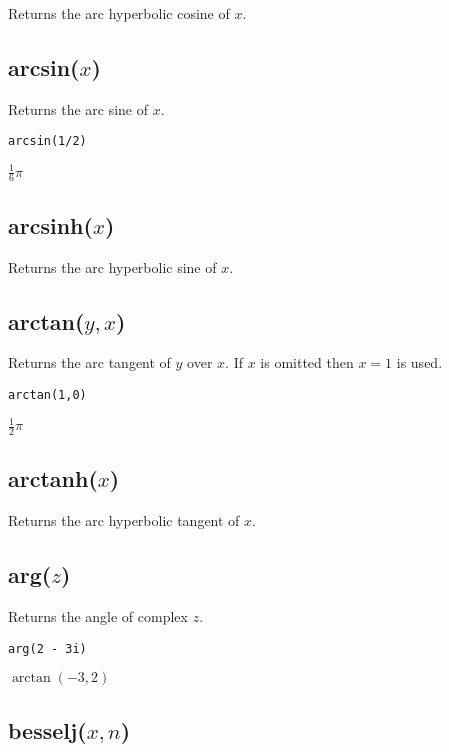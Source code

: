 Returns the arc hyperbolic cosine of $x$.

\subsection*{arcsin($x$)}

Returns the arc sine of $x$.

{\color{blue}
\begin{verbatim}
arcsin(1/2)
\end{verbatim}
}

\noindent
$\tfrac{1}{6}\pi$

\subsection*{arcsinh($x$)}

Returns the arc hyperbolic sine of $x$.

\subsection*{arctan($y,x$)}

Returns the arc tangent of $y$ over $x$.
If $x$ is omitted then $x=1$ is used.

{\color{blue}
\begin{verbatim}
arctan(1,0)
\end{verbatim}
}

\noindent
$\tfrac{1}{2}\pi$

\subsection*{arctanh($x$)}

Returns the arc hyperbolic tangent of $x$.

\subsection*{arg($z$)}

Returns the angle of complex $z$.

{\color{blue}
\begin{verbatim}
arg(2 - 3i)
\end{verbatim}
}

\noindent
$\arctan(-3,2)$

\subsection*{besselj($x,n$)}

